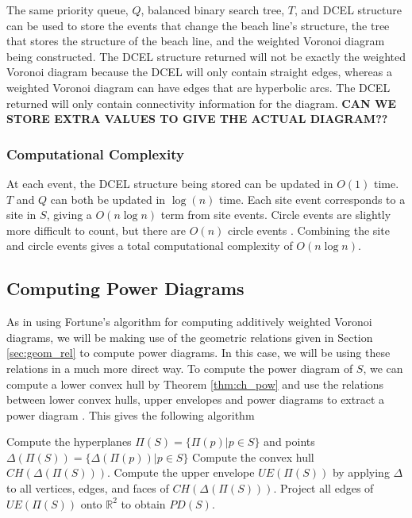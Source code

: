 \documentclass[a4paper, 11pt]{article}
\newcommand{\R}{\mathbb{R}}
\begin{document}
The same priority queue, $Q$, balanced binary search tree, $T$, and DCEL structure can be used to store the events that change the beach line's
structure, the tree that stores the structure of the beach line, and the weighted Voronoi diagram being constructed. The DCEL structure returned will
not be exactly the weighted Voronoi diagram because the DCEL will only contain straight edges, whereas a weighted Voronoi diagram can have edges that
are hyperbolic arcs. The DCEL returned will only contain connectivity information for the diagram. \textbf{CAN WE STORE EXTRA VALUES TO GIVE THE
ACTUAL DIAGRAM??}

\subsubsection{Computational Complexity}

At each event, the DCEL structure being stored can be updated in $O(1)$ time. $T$ and $Q$ can both be updated in $\log(n)$ time. Each site event corresponds to a site in $S$, giving a $O(n \log n)$ term from site events. Circle
events are slightly more difficult to count, but there are $O(n)$ circle events \cite{comp_geom}. Combining the site and circle events gives a total
computational complexity of $O(n \log n)$.

\subsection{Computing Power Diagrams}

As in using Fortune's algorithm for computing additively weighted Voronoi diagrams, we will be making use of the geometric relations given in
Section \ref{sec:geom_rel} to compute power diagrams. In this case, we will be using these relations in a much more direct way. To compute the power
diagram of $S$, we can compute a lower convex hull by Theorem \ref{thm:ch_pow} and use the relations between lower convex hulls, upper envelopes and
power diagrams to extract a power diagram \cite{aurenhammer_power} . This gives the following algorithm

\begin{algorithm}
  \begin{algorithmic}[1]
    \State Compute the hyperplanes $\Pi(S) = \{ \Pi(p) | p \in S \}$ and points $\Delta( \Pi(S) ) = \{ \Delta( \Pi(p) ) | p \in S \}$
    \State Compute the convex hull $CH( \Delta( \Pi(S) ) )$.
    \State Compute the upper envelope $UE( \Pi(S) )$ by applying $\Delta$ to all vertices, edges, and faces of $CH( \Delta( \Pi(S) ) )$.
    \State Project all edges of $UE( \Pi(S) )$ onto $\R^2$ to obtain $PD(S)$.
    \EndFunction
  \end{algorithmic}
\end{algorithm}
\end{document}
